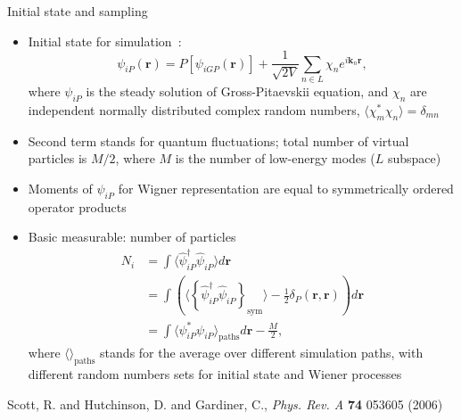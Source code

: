 \documentclass[final,hyperref={pdfpagelabels=false}]{beamer}
\begin{document}
\begin{frame}
\begin{columns}
{\begin{block}{Initial state and sampling}

\begin{itemize}
	\item Initial state for simulation~\cite{scott}:
\[
\psi_{iP}(\mathbf{r}) = P[\psi_{iGP}(\mathbf{r})] + \frac{1}{\sqrt{2V}} \sum\limits_{n \in L} \chi_n e^{i \mathbf{k}_n \mathbf{r}},
\]
		where $\psi_{iP}$ is the steady solution of Gross-Pitaevskii equation,
		and $\chi_n$ are independent normally distributed complex random numbers,
		$\langle \chi_m^* \chi_n \rangle = \delta_{mn}$
	\item Second term stands for quantum fluctuations; total number of virtual particles is $M/2$,
		where $M$ is the number of low-energy modes ($L$ subspace)
	\item Moments of $\psi_{iP}$ for Wigner representation are equal to symmetrically ordered operator products
	\item Basic measurable: number of particles
\begin{align*}
N_i & = \int \langle \hat{\psi}_{iP}^\dagger \hat{\psi}_{iP} \rangle d\mathbf{r} \\
& = \int \left( \langle \left\{ \hat{\psi}_{iP}^\dagger \hat{\psi}_{iP} \right\}_{\textrm{sym}} \rangle -
	\frac{1}{2} \delta_P(\mathbf{r}, \mathbf{r})  \right) d\mathbf{r} \\
& = \int \langle \psi_{iP}^* \psi_{iP} \rangle_{\textrm{paths}} d\mathbf{r} - \frac{M}{2},
\end{align*}
	where $\langle \rangle_{\textrm{paths}}$ stands for the average over different simulation paths,
	with different random numbers sets for initial state and Wiener processes

\end{itemize}

\tiny{ \begin{thebibliography}{9}
	 Scott, R. and Hutchinson, D. and Gardiner, C., \textit{Phys. Rev. A} \textbf{74} 053605 (2006)
\end{thebibliography} }
\end{block}

} %

\end{columns}
\end{frame}
\end{document}
